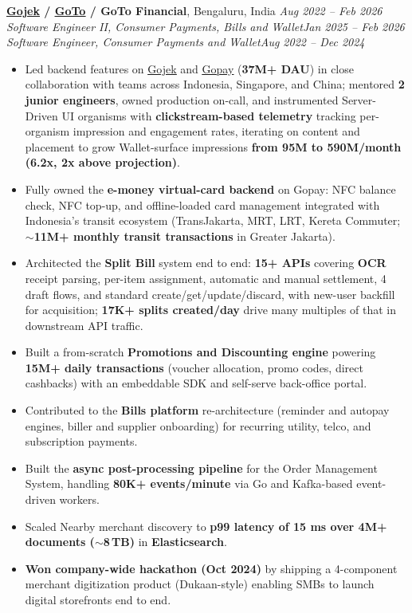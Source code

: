 \documentclass[11pt,letterpaper]{article}
\let\oldhref\href
\renewcommand{\href}[2]{\oldhref{#1}{\uline{#2}}}
\begin{document}
\textbf{\href{https://www.gojek.com/}{Gojek} / \href{https://www.gotocompany.com/en}{GoTo} / GoTo Financial}, Bengaluru, India \hfill \textit{Aug 2022 -- Feb 2026}\\
\textit{Software Engineer II, Consumer Payments, Bills and Wallet}\hfill\textit{Jan 2025 -- Feb 2026}\\
\textit{Software Engineer, Consumer Payments and Wallet}\hfill\textit{Aug 2022 -- Dec 2024}
\begin{itemize}
\item Led backend features on \href{https://play.google.com/store/apps/details?id=com.gojek.app}{Gojek} and \href{https://play.google.com/store/apps/details?id=com.gojek.gopay}{Gopay} (\textbf{37M+ DAU}) in close collaboration with teams across Indonesia, Singapore, and China; mentored \textbf{2 junior engineers}, owned production on-call, and instrumented Server-Driven UI organisms with \textbf{clickstream-based telemetry} tracking per-organism impression and engagement rates, iterating on content and placement to grow Wallet-surface impressions \textbf{from 95M to 590M/month (6.2x, 2x above projection)}.
\item Fully owned the \textbf{e-money virtual-card backend} on Gopay: NFC balance check, NFC top-up, and offline-loaded card management integrated with Indonesia's transit ecosystem (TransJakarta, MRT, LRT, Kereta Commuter; \textbf{$\sim$11M+ monthly transit transactions} in Greater Jakarta).
\item Architected the \textbf{Split Bill} system end to end: \textbf{15+ APIs} covering \textbf{OCR} receipt parsing, per-item assignment, automatic and manual settlement, 4 draft flows, and standard create/get/update/discard, with new-user backfill for acquisition; \textbf{17K+ splits created/day} drive many multiples of that in downstream API traffic.
\item Built a from-scratch \textbf{Promotions and Discounting engine} powering \textbf{15M+ daily transactions} (voucher allocation, promo codes, direct cashbacks) with an embeddable SDK and self-serve back-office portal.
\item Contributed to the \textbf{Bills platform} re-architecture (reminder and autopay engines, biller and supplier onboarding) for recurring utility, telco, and subscription payments.
\item Built the \textbf{async post-processing pipeline} for the Order Management System, handling \textbf{80K+ events/minute} via Go and Kafka-based event-driven workers.
\item Scaled Nearby merchant discovery to \textbf{p99 latency of 15 ms over 4M+ documents ($\sim$8\,TB)} in \textbf{Elasticsearch}.
\item \textbf{Won company-wide hackathon (Oct 2024)} by shipping a 4-component merchant digitization product (Dukaan-style) enabling SMBs to launch digital storefronts end to end.
\end{itemize}
\end{document}

